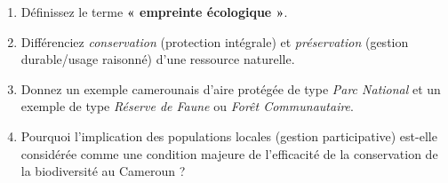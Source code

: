 \documentclass[11pt]{article}
\begin{document}
\begin{exercice}
\begin{enumerate}
    \item Définissez le terme \textbf{« empreinte écologique »}.
    \item Différenciez \textit{conservation} (protection intégrale) et \textit{préservation} (gestion durable/usage raisonné) d'une ressource naturelle.
    \item Donnez un exemple camerounais d'aire protégée de type \textit{Parc National} et un exemple de type \textit{Réserve de Faune} ou \textit{Forêt Communautaire}.
    \item Pourquoi l'implication des populations locales (gestion participative) est-elle considérée comme une condition majeure de l'efficacité de la conservation de la biodiversité au Cameroun ?
\end{enumerate}
\end{exercice}
\end{document}
